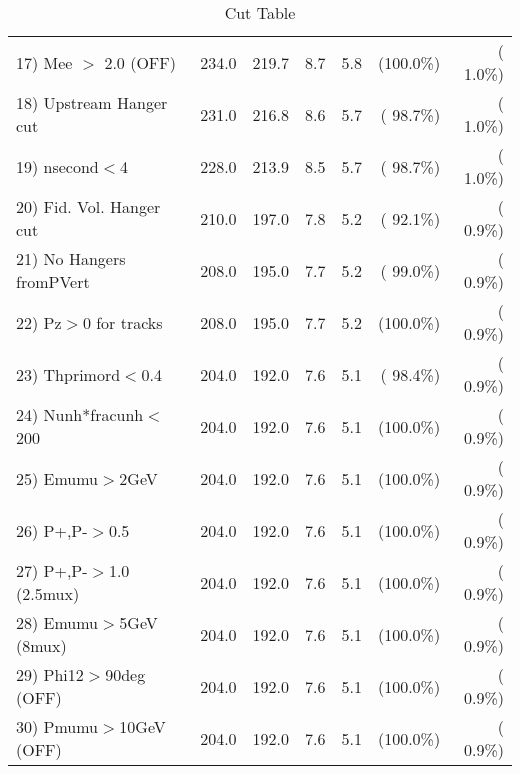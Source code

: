 \begin{table}[h!]
\begin{tabular}{||l||r|r|r|r|r|r||}
 17) Mee $>$ 2.0  (OFF)   &        234.0 &        219.7 &          8.7 &          5.8 & (100.0\%) & (  1.0\%) \\
 18) Upstream Hanger cut  &        231.0 &        216.8 &          8.6 &          5.7 & ( 98.7\%) & (  1.0\%) \\
 19) nsecond$<$4          &        228.0 &        213.9 &          8.5 &          5.7 & ( 98.7\%) & (  1.0\%) \\
 20) Fid. Vol. Hanger cut &        210.0 &        197.0 &          7.8 &          5.2 & ( 92.1\%) & (  0.9\%) \\
 21) No Hangers fromPVert &        208.0 &        195.0 &          7.7 &          5.2 & ( 99.0\%) & (  0.9\%) \\
 22) Pz$>$0 for tracks    &        208.0 &        195.0 &          7.7 &          5.2 & (100.0\%) & (  0.9\%) \\
 23) Thprimord$<$0.4      &        204.0 &        192.0 &          7.6 &          5.1 & ( 98.4\%) & (  0.9\%) \\
 24) Nunh*fracunh$<$200   &        204.0 &        192.0 &          7.6 &          5.1 & (100.0\%) & (  0.9\%) \\
 25) Emumu$>$2GeV         &        204.0 &        192.0 &          7.6 &          5.1 & (100.0\%) & (  0.9\%) \\
 26) P+,P-$>$0.5          &        204.0 &        192.0 &          7.6 &          5.1 & (100.0\%) & (  0.9\%) \\
 27) P+,P-$>$1.0 (2.5mux) &        204.0 &        192.0 &          7.6 &          5.1 & (100.0\%) & (  0.9\%) \\
 28) Emumu$>$5GeV  (8mux) &        204.0 &        192.0 &          7.6 &          5.1 & (100.0\%) & (  0.9\%) \\
 29) Phi12$>$90deg  (OFF) &        204.0 &        192.0 &          7.6 &          5.1 & (100.0\%) & (  0.9\%) \\
 30) Pmumu$>$10GeV  (OFF) &        204.0 &        192.0 &          7.6 &          5.1 & (100.0\%) & (  0.9\%) \\
 \hline
 \hline
 \end{tabular}
 \caption{Cut Table           }
 \label{tab-cutcohjpsi-mumu_cohrho0}
 \end{table}
